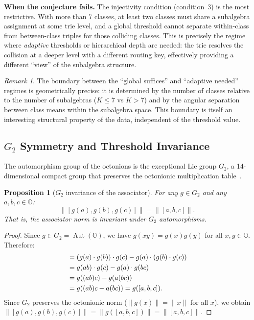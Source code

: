 \documentclass[11pt,a4paper]{article}
\newtheorem{proposition}[theorem]{Proposition}
\theoremstyle{definition}
\theoremstyle{remark}
\newtheorem{remark}[theorem]{Remark}
\DeclareMathOperator{\Aut}{Aut}
\newcommand{\Oct}{\mathbb{O}}
\begin{document}
\textbf{When the conjecture fails.} The injectivity condition (condition~3) is the most restrictive. With more than 7 classes, at least two classes must share a subalgebra assignment at some trie level, and a global threshold cannot separate within-class from between-class triples for those colliding classes. This is precisely the regime where \emph{adaptive} thresholds or hierarchical depth are needed: the trie resolves the collision at a deeper level with a different routing key, effectively providing a different ``view'' of the subalgebra structure.

\begin{remark}
The boundary between the ``global suffices'' and ``adaptive needed'' regimes is geometrically precise: it is determined by the number of classes relative to the number of subalgebras ($K \leq 7$ vs $K > 7$) and by the angular separation between class means within the subalgebra space. This boundary is itself an interesting structural property of the data, independent of the threshold value.
\end{remark}

\subsection{$G_2$ Symmetry and Threshold Invariance}
\label{sec:g2-thresholds}

The automorphism group of the octonions is the exceptional Lie group $G_2$, a 14-dimensional compact group that preserves the octonionic multiplication table~\citep{Baez2002}.

\begin{proposition}[$G_2$ invariance of the associator]
\label{prop:g2-invariance}
For any $g \in G_2$ and any $a, b, c \in \Oct$:
\begin{equation}
  \lVert [g(a), g(b), g(c)] \rVert = \lVert [a, b, c] \rVert.
\end{equation}
That is, the associator norm is invariant under $G_2$ automorphisms.
\end{proposition}

\begin{proof}
Since $g \in G_2 = \Aut(\Oct)$, we have $g(xy) = g(x)g(y)$ for all $x, y \in \Oct$. Therefore:
\begin{align}
  [g(a), g(b), g(c)] &= (g(a) \cdot g(b)) \cdot g(c) - g(a) \cdot (g(b) \cdot g(c)) \notag \\
                      &= g(ab) \cdot g(c) - g(a) \cdot g(bc) \notag \\
                      &= g((ab)c) - g(a(bc)) \notag \\
                      &= g((ab)c - a(bc)) = g([a, b, c]).
\end{align}
Since $G_2$ preserves the octonionic norm ($\lVert g(x) \rVert = \lVert x \rVert$ for all $x$), we obtain $\lVert [g(a), g(b), g(c)] \rVert = \lVert g([a, b, c]) \rVert = \lVert [a, b, c] \rVert$.
\end{proof}
\end{document}
